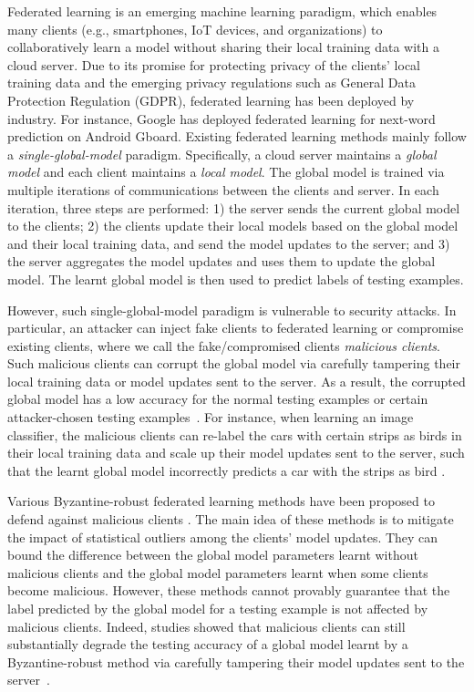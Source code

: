 \documentclass[letterpaper]{article} %
\begin{document}
Federated learning \cite{konevcny2016federated,mcmahan2016communication} is an emerging machine learning paradigm, which enables many clients (e.g., smartphones, IoT devices, and organizations) to collaboratively learn a model without sharing their local training data with a cloud server. Due to its promise for protecting privacy of the clients' local training data and the emerging privacy regulations such as General Data Protection Regulation (GDPR), federated learning has been deployed by industry. For instance, Google has deployed  federated learning for next-word prediction on Android Gboard.  Existing federated learning methods mainly follow a \emph{single-global-model} paradigm.  Specifically, a cloud server maintains a \emph{global model} and each client maintains a \emph{local model}.  The global model is trained via multiple iterations of communications between the clients and server. In each iteration, three steps are performed: 1) the server sends the current global model to the clients; 2) the clients update their local models based on the global model and their local training data, and send the model updates to the server; and 3) the server aggregates the model updates and uses them to update the global model. The learnt global model is then used to predict labels of testing examples.

However, such single-global-model paradigm is vulnerable to security attacks. In particular, an attacker can inject fake clients to federated learning or compromise existing clients, where we call the fake/compromised clients \emph{malicious clients}. Such malicious clients can corrupt the global model via carefully tampering their local training data or model updates sent to the server. As a result, the corrupted global model has a low accuracy for the normal testing examples \cite{fang2019local,Xie19} or certain attacker-chosen testing examples~\cite{Bagdasaryan18,Bhagoji19,xie2019dba}. For instance, when learning an image classifier, the malicious clients can re-label the cars with certain strips as birds in their local training data and scale up their model updates sent to the server, such that the learnt global model incorrectly predicts a car with the strips as bird \cite{Bagdasaryan18}.

Various Byzantine-robust federated learning methods have been proposed to defend against malicious clients \cite{Blanchard17,ChenPOMACS17,Mhamdi18,Yin18,yin2019defending,chen2018draco,alistarh2018byzantine}. The main idea of these methods  is to mitigate the impact of statistical outliers among the clients' model updates. They can bound the difference between the global model parameters learnt without malicious clients and the global model parameters learnt when some clients become malicious. However, these methods cannot provably guarantee that the label predicted by the global model for a testing example is not affected by malicious clients. Indeed, studies showed that malicious clients can still substantially degrade the testing accuracy of a global model learnt by a Byzantine-robust method via carefully tampering their model updates sent to the server~\cite{Bhagoji19,fang2019local,Xie19}.
\end{document}
